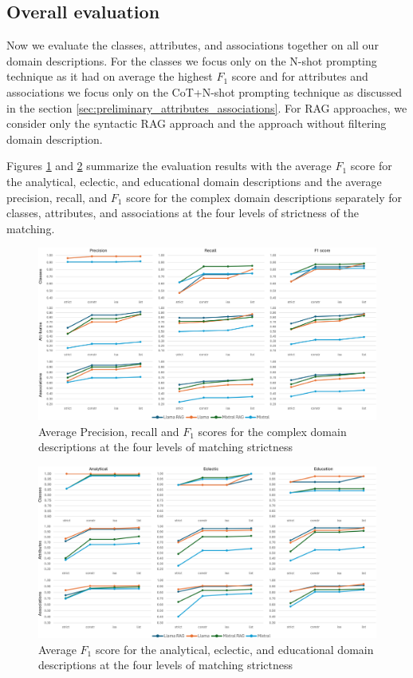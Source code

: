 \subsection{Overall evaluation}
\label{sec:overall_evaluation}

Now we evaluate the classes, attributes, and associations together on all our domain descriptions. For the classes we focus only on the N-shot prompting technique as it had on average the highest $F_1$ score and for attributes and associations we focus only on the CoT+N-shot prompting technique as discussed in the section \ref{sec:preliminary_attributes_associations}. For RAG approaches, we consider only the syntactic RAG approach and the approach without filtering domain description.

Figures \ref{fig:evaluation-complex-p-r-f1} and \ref{fig:evaluation-simple-f1} summarize the evaluation results with the average $F_1$ score for the analytical, eclectic, and educational domain descriptions and the average precision, recall, and $F_1$ score for the complex domain descriptions separately for classes, attributes, and associations at the four levels of strictness of the matching.

\begin{figure}[!h]
    \centering
    \includegraphics[scale=0.10]{img/evaluation-complex-p-r-f1.png}
    \caption{\centering Average Precision, recall and $F_1$ scores for the complex domain descriptions at the four levels of matching strictness}
    \label{fig:evaluation-complex-p-r-f1}
\end{figure}

\begin{figure}[!h]
    \centering
    \includegraphics[scale=0.10]{img/evaluation-simple-f1.png}
    \caption{\centering Average $F_1$ score for the analytical, eclectic, and educational domain descriptions at the four levels of matching strictness}
    \label{fig:evaluation-simple-f1}
\end{figure}


